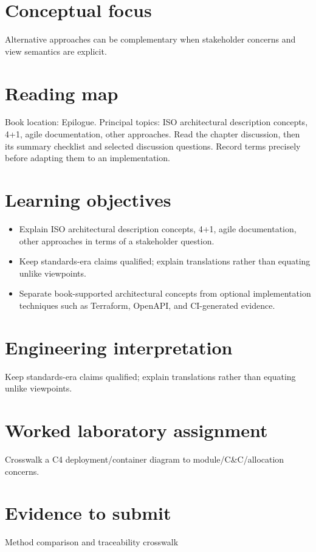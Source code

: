 \documentclass[10pt,letterpaper]{article}
\begin{document}
\DocProvenance
\section{Conceptual focus}
Alternative approaches can be complementary when stakeholder concerns and view semantics are explicit.

\section{Reading map}
Book location: Epilogue. Principal topics: ISO architectural description concepts, 4+1, agile documentation, other approaches. Read the chapter discussion, then its summary checklist and selected discussion questions. Record terms precisely before adapting them to an implementation.

\section{Learning objectives}
\begin{itemize}
\item Explain ISO architectural description concepts, 4+1, agile documentation, other approaches in terms of a stakeholder question.
\item Keep standards-era claims qualified; explain translations rather than equating unlike viewpoints.
\item Separate book-supported architectural concepts from optional implementation techniques such as Terraform, OpenAPI, and CI-generated evidence.
\end{itemize}
\section{Engineering interpretation}
Keep standards-era claims qualified; explain translations rather than equating unlike viewpoints.

\section{Worked laboratory assignment}
Crosswalk a C4 deployment/container diagram to module/C\&C/allocation concerns.

\section{Evidence to submit}
Method comparison and traceability crosswalk
\end{document}

